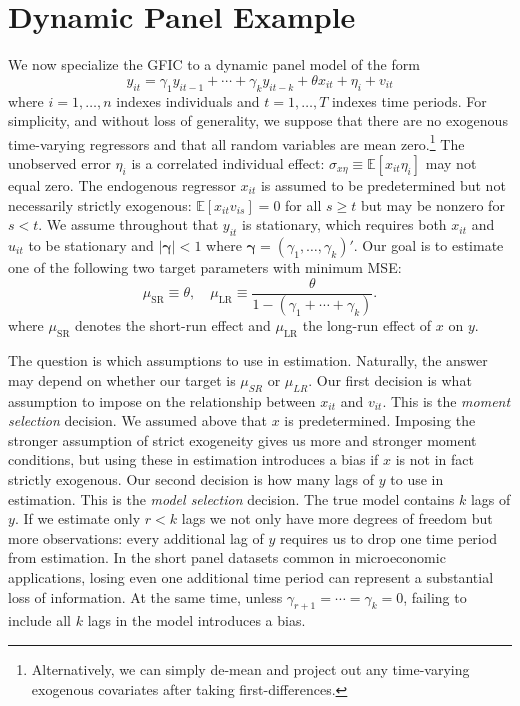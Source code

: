\section{Dynamic Panel Example}
\label{sec:panel}
We now specialize the GFIC to a dynamic panel model of the form 
\begin{equation}
  y_{it} = \gamma_1 y_{it-1} + \cdots + \gamma_k y_{it-k} + \theta x_{it} + \eta_i + v_{it}
  \label{eq:truepanel}
\end{equation}
where $i = 1, \hdots, n$ indexes individuals and $t=1, \hdots, T$  indexes time periods. 
For simplicity, and without loss of generality, we suppose that there are no exogenous time-varying regressors and that all random variables are mean zero.\footnote{Alternatively, we can simply de-mean and project out any time-varying exogenous covariates after taking first-differences.} 
The unobserved error $\eta_i$ is a correlated individual effect: $\sigma_{x\eta}\equiv \mathbb{E}\left[ x_{it}\eta_i \right]$ may not equal zero. 
The endogenous regressor $x_{it}$ is assumed to be predetermined but not necessarily strictly exogenous: $\mathbb{E}[x_{it} v_{is}]=0$ for all $s \geq t$ but may be nonzero for $s < t$.  
We assume throughout that $y_{it}$ is stationary, which requires both $x_{it}$ and $u_{it}$ to be stationary and $|\boldsymbol{\gamma}| < 1$ where $\boldsymbol{\gamma} = (\gamma_1, \dots, \gamma_k)'$.
Our goal is to estimate one of the following two target parameters with minimum MSE: 
\begin{equation}
  \mu_{\text{SR}} \equiv \theta, \quad \mu_{\text{LR}} \equiv \frac{\theta}{1- (\gamma_1 + \cdots + \gamma_k)}.
  \label{eq:paneltarget}
\end{equation}
where $\mu_{\text{SR}}$ denotes the short-run effect and $\mu_{\text{LR}}$ the long-run effect of $x$ on $y$.

The question is which assumptions to use in estimation.
Naturally, the answer may depend on whether our target is $\mu_{SR}$ or $\mu_{LR}$.
Our first decision is what assumption to impose on the relationship between $x_{it}$ and $v_{it}$.
This is the \emph{moment selection} decision.
We assumed above that $x$ is predetermined.
Imposing the stronger assumption of strict exogeneity gives us more and stronger moment conditions, but using these in estimation introduces a bias if $x$ is not in fact strictly exogenous.
Our second decision is how many lags of $y$ to use in estimation.
This is the \emph{model selection} decision.
The true model contains $k$ lags of $y$.
If we estimate only $r < k$ lags we not only have more degrees of freedom but more observations: every additional lag of $y$ requires us to drop one time period from estimation. 
In the short panel datasets common in microeconomic applications, losing even one additional time period can represent a substantial loss of information.
At the same time, unless $\gamma_{r+1} = \cdots = \gamma_k = 0$, failing to include all $k$ lags in the model introduces a bias.

